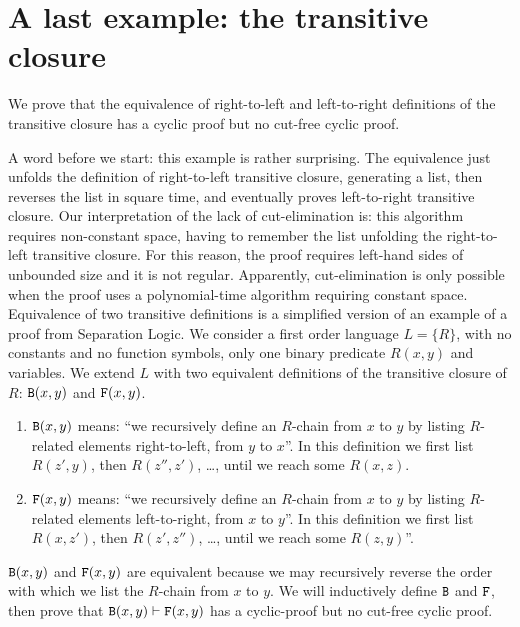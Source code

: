 \documentclass[a4paper,12pt]{article}
\newcommand{\Backward}         { {\tt B} }
\newcommand{\Forward}         { {\tt F} }
\begin{document}

\section{A last example: the transitive closure}
We prove that the equivalence of right-to-left and left-to-right definitions of the transitive closure has a cyclic proof but no cut-free cyclic proof. 

A word before we start: this example is rather surprising. The equivalence just unfolds the definition of right-to-left transitive closure, generating a list, then reverses the list in square time, and eventually proves left-to-right transitive closure. Our interpretation of the lack of cut-elimination is: this algorithm requires non-constant space, having to remember the list unfolding the right-to-left transitive closure. For this reason, the proof requires left-hand sides of unbounded size and it is not regular. Apparently, cut-elimination is only possible when the proof uses a polynomial-time algorithm requiring constant space.
\\

Equivalence of two transitive definitions is a simplified version of an example of a proof from Separation Logic. 
We consider a first order language $L = \{R\}$, with no constants and no function symbols, only one binary predicate $R(x,y)$ and variables. 
We extend $L$ with two equivalent definitions of the transitive closure of $R$: $\Backward(x,y)$ and $\Forward(x,y)$. 
\begin{enumerate}
\item
$\Backward(x,y)$ means:  ``we recursively define an $R$-chain from $x$ to $y$ by listing $R$-related elements right-to-left, from $y$ to $x$''. In this definition we first list $R(z',y)$, then $R(z'',z')$, \ldots, until we reach some $R(x,z)$. 
\item
$\Forward(x,y)$ means: ``we recursively define an $R$-chain from $x$ to $y$ by listing $R$-related elements left-to-right, from $x$ to $y$''.  In this definition we first list $R(x,z')$, then $R(z',z'')$, \ldots, until we reach some $R(z,y)$''. 
\end{enumerate}
$\Backward(x,y)$ and $\Forward(x,y)$ are equivalent because we may recursively reverse the order with which we list the $R$-chain from $x$ to $y$. We will inductively define $\Backward$ and $\Forward$, then prove that $\Backward(x,y) \vdash \Forward(x,y)$ has a cyclic-proof but no cut-free cyclic proof.
\end{document}
